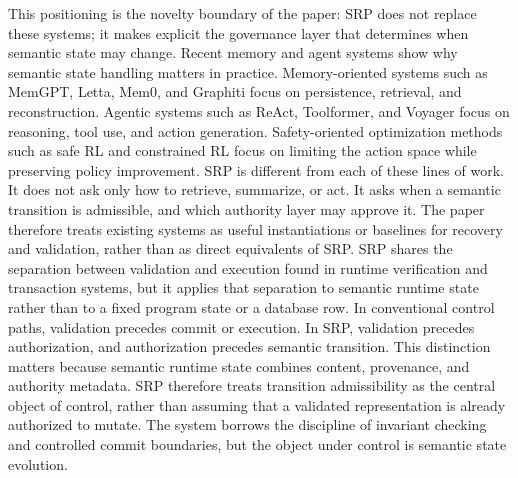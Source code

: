 {}\markdownRendererInterblockSeparator
{}This positioning is the novelty boundary of the paper: SRP does not replace these systems; it makes explicit the governance layer that determines when semantic state may change.\markdownRendererInterblockSeparator
{}
\markdownRendererSectionEnd \markdownRendererSectionBegin
{}\markdownRendererInterblockSeparator
{}Recent memory and agent systems show why semantic state handling matters in practice. Memory-oriented systems such as MemGPT, Letta, Mem0, and Graphiti focus on persistence, retrieval, and reconstruction. Agentic systems such as ReAct, Toolformer, and Voyager focus on reasoning, tool use, and action generation. Safety-oriented optimization methods such as safe RL and constrained RL focus on limiting the action space while preserving policy improvement.\markdownRendererParagraphSeparator
{}SRP is different from each of these lines of work. It does not ask only how to retrieve, summarize, or act. It asks when a semantic transition is admissible, and which authority layer may approve it. The paper therefore treats existing systems as useful instantiations or baselines for recovery and validation, rather than as direct equivalents of SRP.\markdownRendererInterblockSeparator
{}
\markdownRendererSectionEnd \markdownRendererSectionBegin
{}\markdownRendererInterblockSeparator
{}SRP shares the separation between validation and execution found in runtime verification and transaction systems, but it applies that separation to semantic runtime state rather than to a fixed program state or a database row. In conventional control paths, validation precedes commit or execution. In SRP, validation precedes authorization, and authorization precedes semantic transition.\markdownRendererParagraphSeparator
{}This distinction matters because semantic runtime state combines content, provenance, and authority metadata. SRP therefore treats transition admissibility as the central object of control, rather than assuming that a validated representation is already authorized to mutate. The system borrows the discipline of invariant checking and controlled commit boundaries, but the object under control is semantic state evolution.\markdownRendererParagraphSeparator
